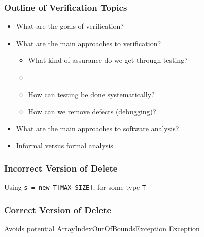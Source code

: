 \documentclass[t,12pt,numbers,fleqn]{beamer}
\begin{document}

\begin{frame}
\frametitle{Outline of Verification Topics}

\begin{itemize}

\item What are the goals of verification?
\item What are the main approaches to verification?
\begin{itemize}
\item What kind of assurance do we get through testing?  
\item {}
\item How can testing be done systematically?
\item How can we remove defects (debugging)?
\end{itemize}
\item What are the main approaches to software analysis?
\item Informal versus formal analysis

\end{itemize}

\end{frame}


\begin{frame}
\frametitle{Incorrect Version of Delete}

Using \texttt{s = new T[MAX\_SIZE]}, for some type \texttt{T}

\lstset{language=java,breaklines=true,showspaces=false,showstringspaces=false,breakatwhitespace=true}
\noindent 

\bi
\item {}
\item {}
\ei

\end{frame}


\begin{frame}
\frametitle{Correct Version of Delete}

\lstset{language=java,breaklines=true,showspaces=false,showstringspaces=false,breakatwhitespace=true}
\noindent 

Avoids potential ArrayIndexOutOfBoundsException Exception

\end{frame}
\end{document}
